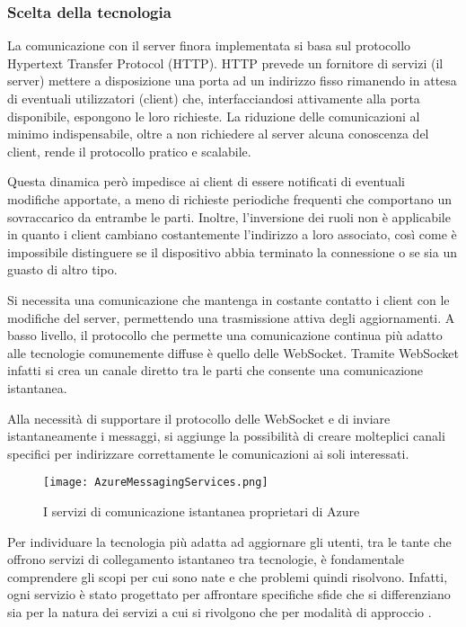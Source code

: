 \subsubsection{ Scelta della tecnologia}


La comunicazione con il server finora implementata si basa sul protocollo Hypertext Transfer Protocol (HTTP). HTTP prevede un fornitore di servizi (il server) mettere a disposizione una porta ad un indirizzo fisso rimanendo in attesa di eventuali utilizzatori (client) che, interfacciandosi attivamente alla porta disponibile,  espongono le loro richieste.
La riduzione delle comunicazioni al minimo indispensabile, oltre a non richiedere al server alcuna conoscenza del client, rende il protocollo pratico e scalabile.

Questa dinamica però impedisce ai client di essere notificati di eventuali modifiche apportate, a meno di richieste periodiche frequenti che comportano un sovraccarico da entrambe le parti. Inoltre, l’inversione dei ruoli non è applicabile in quanto i client cambiano costantemente l’indirizzo a loro associato, così come è impossibile distinguere se il dispositivo abbia terminato la connessione o se sia un guasto di altro tipo. 

Si necessita una comunicazione che mantenga in costante contatto i client con le modifiche del server, permettendo una trasmissione attiva degli aggiornamenti.
A basso livello, il protocollo che permette una comunicazione continua più adatto alle tecnologie comunemente diffuse è quello delle WebSocket. Tramite WebSocket infatti si crea un canale diretto tra le parti che consente una comunicazione istantanea. 

Alla necessità di supportare il protocollo delle WebSocket e di inviare istantaneamente i messaggi, si aggiunge la possibilità di creare molteplici canali specifici per indirizzare correttamente le comunicazioni ai soli interessati.


\begin{figure}[h!]
    \centering
    \texttt{[image: AzureMessagingServices.png]}
    \caption{I servizi di comunicazione istantanea proprietari di Azure}
\end{figure}	


Per individuare la tecnologia più adatta ad aggiornare gli utenti, tra le tante che offrono servizi di collegamento istantaneo tra tecnologie, è fondamentale comprendere  gli scopi per cui sono nate e che problemi quindi risolvono. Infatti, ogni servizio è stato progettato per affrontare specifiche sfide che si differenziano sia per la natura dei servizi a cui si rivolgono che per  modalità di approccio .

